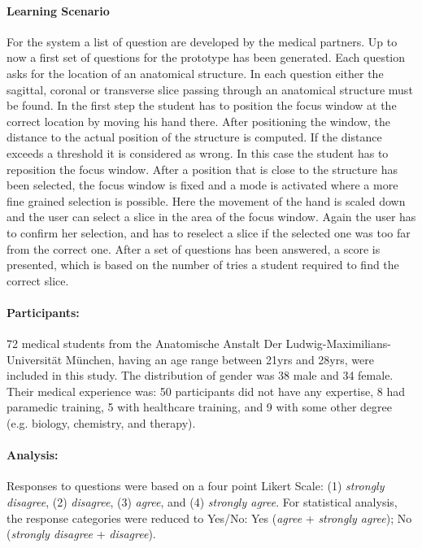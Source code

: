 {{{{{{\paragraph{Learning Scenario} For the system a list of question are developed by the medical partners. Up to now a first set of questions for the prototype has been generated. Each question asks for the location of an anatomical structure. In each question either the sagittal, coronal or transverse slice passing through an anatomical structure must be found. In the first step the student has to position the focus window at the correct location by moving his hand there. After positioning the window, the distance to the actual position of the structure is computed. If the distance exceeds a threshold it is considered as wrong. In this case the student has to reposition the focus window. After a position that is close to the structure has been selected, the focus window is fixed and a mode is activated where a more fine grained selection is possible. Here the movement of the hand is scaled down and the user can select a slice in the area of the focus window. Again the user has to confirm her selection, and has to reselect a slice if the selected one was too far from the correct one. After a set of questions has been answered, a score is presented, which is based on the number of tries a student required to find the correct slice.

\paragraph{Participants:} 72 medical students from the Anatomische Anstalt Der Ludwig-Maximilians-Universit\"at M\"unchen, having an age range between 21yrs and 28yrs, were included in this study. The distribution of gender was 38 male and 34 female. Their medical experience was: 50 participants did not have any expertise, 8 had paramedic training, 5 with healthcare training, and 9 with some other degree (e.g. biology, chemistry, and therapy). 

\paragraph{Analysis:} Responses to questions were based on a four point Likert Scale: (1) \textit{strongly disagree}, (2) \textit{disagree}, (3) \textit{agree}, and (4) \textit{strongly agree}. For statistical analysis, the response categories were reduced to Yes/No: Yes (\textit{agree} + \textit{strongly agree}); No (\textit{strongly disagree} + \textit{disagree}).

}}}}}}
